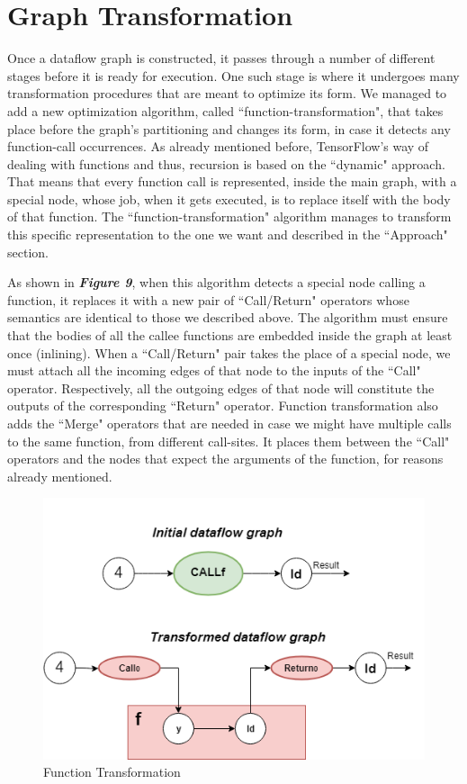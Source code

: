 \documentclass[ack,preface]{dithesis}
\begin{document}
    \section{Graph Transformation}
Once a dataflow graph is constructed, it passes through a number of different stages before it is ready for execution. One such stage is where it undergoes many transformation procedures that are meant to optimize its form. We managed to add a new optimization algorithm, called ``function-transformation", that takes place before the graph's partitioning and changes its form, in case it detects any function-call occurrences.
As already mentioned before, TensorFlow's  way of dealing with functions and thus, recursion is based on the ``dynamic" approach. That means that every function call is represented, inside the main graph, with a special node, whose job, when it gets executed, is to replace itself with the body of that function. The ``function-transformation" algorithm  manages to transform this specific representation to the one we want and described in the ``Approach" section. 

As shown in \textit{\textbf{Figure 9}}, when this algorithm detects a special node calling a function, it replaces it with a new pair of ``Call/Return" operators whose semantics are identical to those we described above. The algorithm must ensure that the bodies of all the callee functions are embedded inside the graph at least once (inlining).
When a ``Call/Return" pair takes the place of a special node, we must attach all the incoming edges of that node to the inputs of the ``Call" operator. Respectively, all the outgoing edges of that node will constitute the outputs of the corresponding ``Return" operator. Function transformation also adds the ``Merge" operators that are needed in case we might have multiple calls to the same function, from different call-sites. It places them between the ``Call" operators and the nodes that expect the arguments of the function, for reasons already mentioned.



\begin{figure}
\centering
\includegraphics[scale=0.65]{figures/transformation}
\caption{Function Transformation}
\end{figure}
\end{document}
